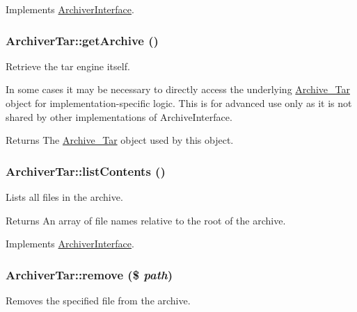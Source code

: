 Implements \hyperlink{interfaceArchiverInterface_aedd1c39f36b45e2f12381003d83ee4bf}{ArchiverInterface}.\hypertarget{classArchiverTar_a2898ddb1ed703ef248a7358be9237c86}{
\subsubsection[{getArchive}]{\setlength{\rightskip}{0pt plus 5cm}ArchiverTar::getArchive ()}}
\label{classArchiverTar_a2898ddb1ed703ef248a7358be9237c86}
Retrieve the tar engine itself.

In some cases it may be necessary to directly access the underlying \hyperlink{classArchive__Tar}{Archive\_\-Tar} object for implementation-\/specific logic. This is for advanced use only as it is not shared by other implementations of ArchiveInterface.

\begin{DoxyReturn}{Returns}
The \hyperlink{classArchive__Tar}{Archive\_\-Tar} object used by this object. 
\end{DoxyReturn}
\hypertarget{classArchiverTar_a6293cb8fd0519ae617a789ea08799914}{
\subsubsection[{listContents}]{\setlength{\rightskip}{0pt plus 5cm}ArchiverTar::listContents ()}}
\label{classArchiverTar_a6293cb8fd0519ae617a789ea08799914}
Lists all files in the archive.

\begin{DoxyReturn}{Returns}
An array of file names relative to the root of the archive. 
\end{DoxyReturn}


Implements \hyperlink{interfaceArchiverInterface_a0be527152061af9bfd22a525fc29d78d}{ArchiverInterface}.\hypertarget{classArchiverTar_a7e3e6cc10110d77b1411074f7e65c2e0}{
\subsubsection[{remove}]{\setlength{\rightskip}{0pt plus 5cm}ArchiverTar::remove (\$ {\em path})}}
\label{classArchiverTar_a7e3e6cc10110d77b1411074f7e65c2e0}
Removes the specified file from the archive.


